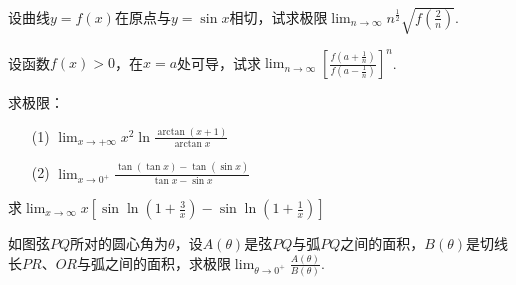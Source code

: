 \begin{xiti}
\item 设曲线$y=f(x)$在原点与$y=\sin x$相切，试求极限$\lim _ { n \rightarrow \infty } n ^ { \frac { 1 } { 2 } } \sqrt { f \left( \frac { 2 } { n } \right) }$.
\item 设函数$f(x)>0$，在$x=a$处可导，试求$\lim _ { n \rightarrow \infty } \left[ \frac { f \left( a + \frac { 1 } { n } \right) } { f \left( a - \frac { 1 } { n } \right) } \right] ^ { n }$.
\item 求极限：
\begin{enumerate}
	\item[(1)] $\lim _ { x \rightarrow + \infty } x ^ { 2 } \ln \frac { \arctan ( x + 1 ) } { \arctan x }$
	\item[(2)] $\lim _ { x \rightarrow 0 ^ {+ } } \frac { \tan ( \tan x ) - \tan ( \sin x ) } { \tan x - \sin x }$
\end{enumerate}
\item 求$\lim _ { x \rightarrow \infty } x \left[ \sin \ln \left( 1 + \frac { 3 } { x } \right) - \sin \ln \left( 1 + \frac { 1 } { x } \right) \right]$
\item 如图弦$PQ$所对的圆心角为$\theta$，设$A(\theta)$是弦$PQ$与弧$PQ$之间的面积，$B(\theta)$是切线长$PR$、$OR$与弧之间的面积，求极限$\lim _ { \theta \rightarrow 0 ^ { + } } \frac { A ( \theta ) } { B ( \theta ) }$.


\end{xiti}

